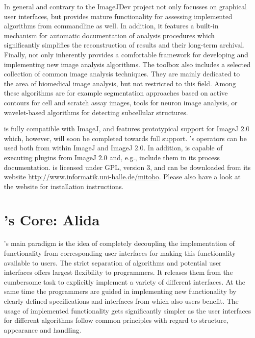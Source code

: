 In general and contrary to the ImageJDev project \mitobo not only focusses on graphical user 
interfaces, but provides mature functionality for assessing implemented algorithms from commandline 
as well. In addition, it features a built-in mechanism for automatic documentation of analysis 
procedures which significantly simplifies the reconstruction of results and their long-term archival.
Finally, \mitobo not only inherently provides a comfortable framework for developing and 
implementing new image analysis algorithms. The toolbox also includes a selected collection of common image 
analysis techniques. They are mainly dedicated to the area of biomedical image analysis, but not restricted
to this field. Among these algorithms are for example segmentation approaches based on active 
contours for cell and scratch assay images, tools for neuron image analysis, or wavelet-based 
algorithms for detecting subcellular structures.

\mitobo is fully compatible with ImageJ, and features prototypical support for ImageJ $2.0$
which, however, will soon be completed towards full support. \mitobo's operators can be used both from 
within ImageJ and ImageJ $2.0$. In addition, \mitobo is capable of executing plugins from ImageJ 
$2.0$ and, e.g., include them in its process documentation. \mitobo is licensed under GPL, version
$3$, and can be downloaded from its website 
\href{http://www.informatik.uni-halle.de/mitobo}{http://www.informatik.uni-halle.de/mitobo}.
Please also have a look at the website for installation instructions.

\section{\mitobo's Core: Alida}
\mitobo's main paradigm is the idea of completely decoupling the implementation of functionality
from corresponding user interfaces for making this functionality available to users. The strict 
separation of algorithms and potential user interfaces offers largest flexibility to programmers.
It releases them from the cumbersome task to explicitly implement a variety of different interfaces.
At the same time the programmers are guided in implementing new functionality by clearly defined 
specifications and interfaces from which also users benefit. The usage of implemented 
functionality gets significantly simpler as the user interfaces for different algorithms follow 
common principles with regard to structure, appearance and handling.    

